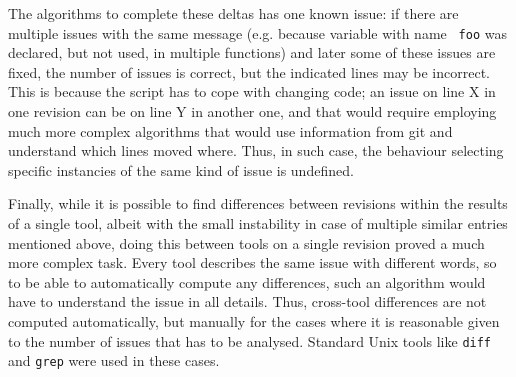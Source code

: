 The algorithms to complete these deltas has one known issue: if there are
multiple issues with the same message (e.g. because variable with name {\tt
				       foo} was declared, but not used, in
				       multiple functions) and later some of
these issues are fixed, the number of issues is correct, but the indicated
lines may be incorrect. This is because the script has to cope with changing
code; an issue on line X in one revision can be on line Y in another one, and
that would require employing much more complex algorithms that would use
information from git and understand which lines moved where. Thus, in such
case, the behaviour selecting specific instancies of the same kind of issue is
undefined.


%
%
%

Finally, while it is possible to find differences between revisions within the
results of a single tool, albeit with the small instability in case of multiple
similar entries mentioned above, doing this between tools on a single revision
proved a much more complex task. Every tool describes the same issue with
different words, so to be able to automatically compute any differences, such
an algorithm would have to understand the issue in all details. Thus,
cross-tool differences are not computed automatically, but manually for the
cases where it is reasonable given to the number of issues that has to be
analysed. Standard Unix tools like {\tt diff} and {\tt grep} were used in these
cases.
